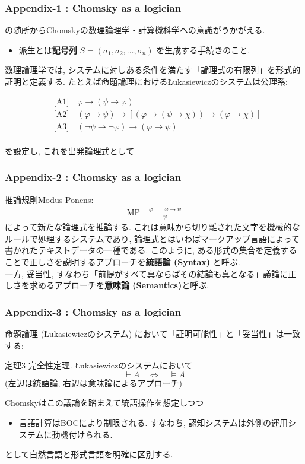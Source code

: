 \documentclass[dvipdfmx, xcolor={dvipsnames},12pt]{beamer}
\begin{document}
\begin{frame}
\frametitle{Appendix-1 : Chomsky as a logician}

\cite{Chomsky1995}の随所からChomskyの数理論理学・計算機科学への意識がうかがえる. \\
\begin{itemize}
\item 派生とは\textbf{記号列} $S = (\sigma_1,\sigma_2,\dots,\sigma_n)$ を生成する手続きのこと.
\end{itemize}
\vspace{5pt}
数理論理学では, システムに対しある条件を満たす「論理式の有限列」を形式的証明と定義する. たとえば命題論理におけるŁukasiewiczのシステムは公理系:

\begin{align*}
&\text{[A1]} \quad \varphi \to (\psi \to \varphi)\\
&\text{[A2]} \quad (\varphi \to \psi) \to [(\varphi \to (\psi \to \chi)) \to (\varphi \to \chi)]\\
&\text{[A3]} \quad (\lnot\psi \to \lnot\varphi) \to (\varphi \to \psi)\\
\end{align*}

を設定し, これを出発論理式として
\end{frame}


\begin{frame}
\frametitle{Appendix-2 : Chomsky as a logician}
推論規則Modus Ponens:
\begin{align*}
\text{MP} \quad \frac{\varphi \qquad \varphi \to \psi}{\psi} 
\end{align*}
によって新たな論理式を推論する. これは意味から切り離された文字を機械的なルールで処理するシステムであり, 論理式とはいわばマークアップ言語によって書かれたテキストデータの一種である. このように, ある形式の集合を定義することで正しさを説明するアプローチを\textbf{統語論 (Syntax)} と呼ぶ.\\
\vspace{5pt}
\quad 一方, 妥当性, すなわち「前提がすべて真ならばその結論も真となる」議論に正しさを求めるアプローチを\textbf{意味論 (Semantics)}と呼ぶ. 
\end{frame} 

\begin{frame}
\frametitle{Appendix-3 : Chomsky as a logician}
命題論理 (Łukasiewiczのシステム) において「証明可能性」と「妥当性」は一致する:

\begin{thm}{定理3 完全性定理.}
Łukasiewiczのシステムにおいて
\[
\vdash A \quad \Longleftrightarrow \quad \models A
\]
(左辺は統語論, 右辺は意味論によるアプローチ)
\end{thm}

Chomskyはこの議論を踏まえて統語操作を想定しつつ
\begin{itemize}
\item 言語計算はBOCにより制限される. すなわち, 認知システムは外側の運用システムに動機付けられる.
\end{itemize}
として自然言語と形式言語を明確に区別する.
\end{frame}
\end{document}
